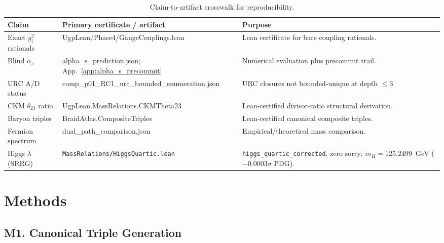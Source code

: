 \documentclass[11pt]{article}
\theoremstyle{remark}
\begin{document}
\clearpage
\begin{table}[H]
\centering
\caption{Claim-to-artifact crosswalk for reproducibility.}
\label{tab:claim_artifact_crosswalk}
\small
\renewcommand{\arraystretch}{1.15}
\begin{tabularx}{\linewidth}{@{}p{2.8cm}>{\RaggedRight\ttfamily\small}p{4.6cm}>{\RaggedRight}X@{}}
\toprule
\textbf{Claim} & \textbf{\normalfont Primary certificate / artifact} & \textbf{Purpose} \\
\midrule
Exact $g_i^2$ rationals & UgpLean/\allowbreak Phase4/\allowbreak GaugeCouplings.lean & Lean certificate for bare coupling rationals. \\
Blind $\alpha_s$ & alpha\_s\_\allowbreak prediction.json; App.~\ref{app:alpha_s_precommit} & Numerical evaluation plus precommit trail. \\
URC A/D status & comp\_p01\_\allowbreak RC1\_urc\_\allowbreak bounded\_\allowbreak enumeration.json & URC closures not bounded-unique at depth $\le 3$. \\
CKM $\theta_{23}$ ratio & UgpLean.\allowbreak MassRelations.\allowbreak CKMTheta23 & Lean-certified divisor-ratio structural derivation. \\
Baryon triples & BraidAtlas.\allowbreak CompositeTriples & Lean-certified canonical composite triples. \\
Fermion spectrum & dual\_path\_\allowbreak comparison.json & Empirical/theoretical mass comparison. \\
Higgs $\lambda$ (SRRG) & \texttt{MassRelations/\allowbreak{}HiggsQuartic.lean} & \texttt{higgs\_quartic\_corrected}, zero sorry; $m_H = 125.2499$~GeV ($-0.0003\sigma$ PDG). \\
\bottomrule
\end{tabularx}
\end{table}

\section*{Methods}

\subsection*{M1. Canonical Triple Generation}
\end{document}
